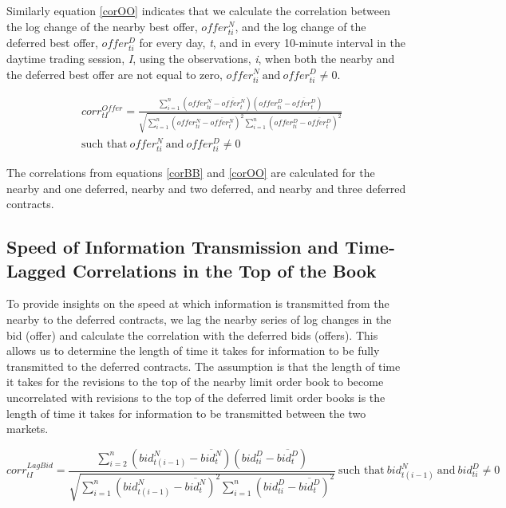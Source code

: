\documentclass[]{elsarticle} %
\begin{document}
Similarly equation \ref{corOO} indicates that we calculate the
correlation between the log change of the nearby best offer,
\(offer_{ti}^N\), and the log change of the deferred best offer,
\(offer_{ti}^D\) for every day, \emph{t}, and in every 10-minute
interval in the daytime trading session, \emph{I}, using the
observations, \emph{i}, when both the nearby and the deferred best offer
are not equal to zero,
\({offer_{ti}^N \: \textrm{and} \: offer_{ti}^D} \neq 0\).

\begin{equation} \label{corOO}
\begin{split}
& corr^{Offer}_{tI} = \frac{\sum\limits_{i=1}^{n} \left(offer_{ti}^N - \overline{offer_t^N}\right) \left(offer_{ti}^D - \overline{offer_t^D}\right)}{\sqrt{\sum\limits_{i=1}^{n} \left(offer_{ti}^N - \overline{offer_t^N}\right)^2 \sum\limits_{i=1}^{n}\left(offer_{ti}^D - \overline{offer_t^D}\right)^2}} \\
& \textrm{such that} \: {offer_{ti}^N \: \textrm{and} \: offer_{ti}^D} \neq 0 
\end{split}
\end{equation}

The correlations from equations \ref{corBB} and \ref{corOO} are
calculated for the nearby and one deferred, nearby and two deferred, and
nearby and three deferred contracts.

\subsection{Speed of Information Transmission and Time-Lagged
Correlations in the Top of the
Book}\label{speed-of-information-transmission-and-time-lagged-correlations-in-the-top-of-the-book}

To provide insights on the speed at which information is transmitted
from the nearby to the deferred contracts, we lag the nearby series of
log changes in the bid (offer) and calculate the correlation with the
deferred bids (offers). This allows us to determine the length of time
it takes for information to be fully transmitted to the deferred
contracts. The assumption is that the length of time it takes for the
revisions to the top of the nearby limit order book to become
uncorrelated with revisions to the top of the deferred limit order books
is the length of time it takes for information to be transmitted between
the two markets.

\begin{equation} \label{corLBB}
corr^{LagBid}_{tI} = \frac{\sum\limits_{i=2}^{n} \left(bid_{t(i-1)}^N - \overline{bid_t^N}\right) \left(bid_{ti}^D - \overline{bid_t^D}\right)}{\sqrt{\sum\limits_{i=1}^{n} \left(bid_{t(i-1)}^N - \overline{bid_t^N}\right)^2 \sum\limits_{i=1}^{n}\left(bid_{ti}^D - \overline{bid_t^D}\right)^2}} \: \textrm{such that} \: {bid_{t(i-1)}^N \: \textrm{and} \: bid_{ti}^D} \neq 0
\end{equation}
\end{document}
